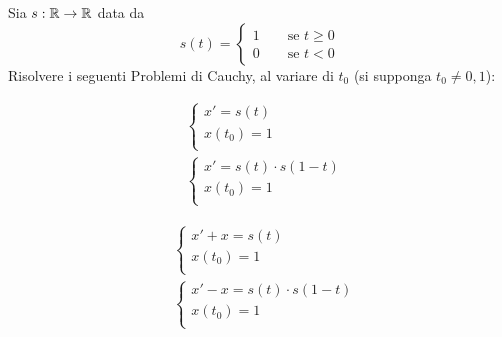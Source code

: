 \begin{exercise}
	Sia $s:\mathbb{R} \to \mathbb{R}$ data da
	\[s(t) =
	\begin{cases}
		1 \qquad \text{se } t \geq 0\\
		0 \qquad \text{se } t < 0
	\end{cases}\]
	Risolvere i seguenti Problemi di Cauchy, al variare di $t_0$ (si supponga $t_0 \neq 0,1$):

	\begin{minipage}{0.48\linewidth}
		\begin{align*}
			&\begin{cases}
				x' = s(t)\\
				x(t_0) = 1\\
			\end{cases}\\
			&\begin{cases}
				x' = s(t) \cdot s(1-t)\\
				x(t_0) = 1\\
			\end{cases}
		\end{align*}
	\end{minipage}
	\begin{minipage}{0.48\linewidth}
		\begin{align*}
			&\begin{cases}
				x' + x = s(t)\\
				x(t_0) = 1\\
			\end{cases}\\
			&\begin{cases}
				x' - x = s(t) \cdot s(1-t)\\
				x(t_0) = 1\\
			\end{cases}
		\end{align*}
	\end{minipage}
\end{exercise}
